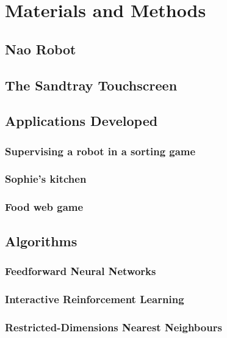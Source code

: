 \chapter{Materials and Methods}\label{chap:method}

\section{Nao Robot}

\section{The Sandtray Touchscreen}

\section{Applications Developed}

\subsection{Supervising a robot in a sorting game}

\subsection{Sophie's kitchen}

\subsection{Food web game}

\section{Algorithms}

\subsection{Feedforward Neural Networks}

\subsection{Interactive Reinforcement Learning}

\subsection{Restricted-Dimensions Nearest Neighbours}

\cite{senft2015sparc}

